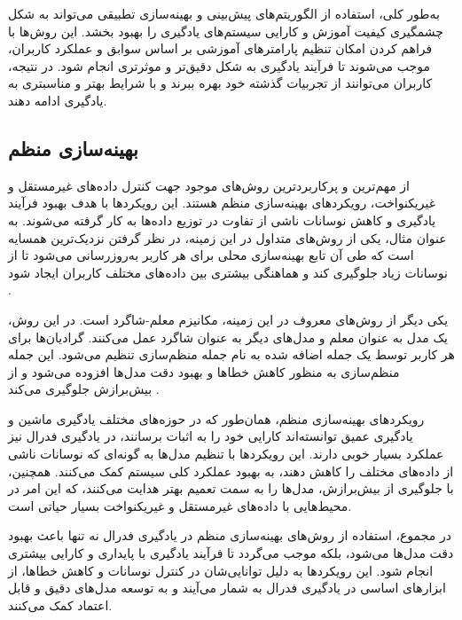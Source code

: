 به‌طور کلی، استفاده از الگوریتم‌های پیش‌بینی و بهینه‌سازی تطبیقی می‌تواند به شکل چشمگیری کیفیت آموزش و کارایی سیستم‌های یادگیری را بهبود بخشد. این روش‌ها با فراهم کردن امکان تنظیم پارامترهای آموزشی بر اساس سوابق و عملکرد کاربران، موجب می‌شوند تا فرآیند یادگیری به شکل دقیق‌تر و موثرتری انجام شود. در نتیجه، کاربران می‌توانند از تجربیات گذشته خود بهره ببرند و با شرایط بهتر و مناسبتری به یادگیری ادامه دهند.



\subsection{بهینه‌سازی منظم}
از مهم‌ترین و پرکاربردترین روش‌های موجود جهت کنترل داده‌های غیرمستقل و غیریکنواخت، رویکردهای بهینه‌سازی منظم هستند. این رویکردها با هدف بهبود فرآیند یادگیری و کاهش نوسانات ناشی از تفاوت در توزیع داده‌ها به کار گرفته می‌شوند. به عنوان مثال، یکی از روش‌های متداول در این زمینه، در نظر گرفتن نزدیک‌ترین همسایه است که طی آن تابع بهینه‌سازی محلی برای هر کاربر به‌روزرسانی می‌شود تا از نوسانات زیاد جلوگیری کند و هماهنگی بیشتری بین داده‌های مختلف کاربران ایجاد شود
\cite{li2020federatedheteroneneous}.

یکی دیگر از روش‌های معروف در این زمینه، مکانیزم معلم-شاگرد%
است. در این روش، یک مدل به عنوان معلم و مدل‌های دیگر به عنوان شاگرد عمل می‌کنند. گرادیان‌ها برای هر کاربر توسط یک جمله اضافه شده به نام جمله منظم‌سازی%
تنظیم می‌شود. این جمله منظم‌سازی به منظور کاهش خطاها و بهبود دقت مدل‌ها افزوده می‌شود و از بیش‌برازش%
جلوگیری می‌کند
\cite{li2020communication}.

رویکردهای بهینه‌سازی منظم، همان‌طور که در حوزه‌های مختلف یادگیری ماشین و یادگیری عمیق توانسته‌اند کارایی خود را به اثبات برسانند، در یادگیری فدرال نیز عملکرد بسیار خوبی دارند. این رویکردها با تنظیم مدل‌ها به گونه‌ای که نوسانات ناشی از داده‌های مختلف را کاهش دهند، به بهبود عملکرد کلی سیستم کمک می‌کنند. همچنین، با جلوگیری از بیش‌برازش، مدل‌ها را به سمت تعمیم بهتر هدایت می‌کنند، که این امر در محیط‌هایی با داده‌های غیرمستقل و غیریکنواخت بسیار حیاتی است.

در مجموع، استفاده از روش‌های بهینه‌سازی منظم در یادگیری فدرال نه تنها باعث بهبود دقت مدل‌ها می‌شود، بلکه موجب می‌گردد تا فرآیند یادگیری با پایداری و کارایی بیشتری انجام شود. این رویکردها به دلیل توانایی‌شان در کنترل نوسانات و کاهش خطاها، از ابزارهای اساسی در یادگیری فدرال به شمار می‌آیند و به توسعه مدل‌های دقیق و قابل اعتماد کمک می‌کنند.



